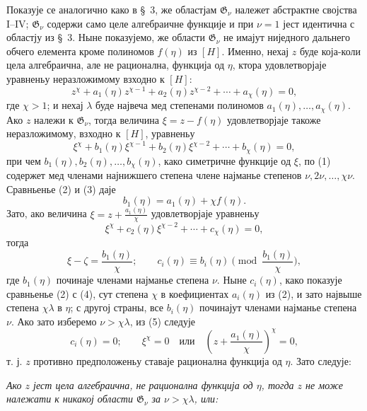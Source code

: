 ﻿\documentclass[11pt]{article}
\begin{document}
Показује се аналогично како в \S\ 3, же областјам $\mathfrak G_\nu$ належет
абстрактне својства I--IV; $\mathfrak G_\nu$ содержи само целе алгебраичне
функције и при $\nu=1$ јест идентична с областју из \S\ 3. Ныне показујемо, же
области $\mathfrak G_\nu$ не имајут ниједного дальнего обчего елемента кроме
полиномов $f(\eta)$ из $[H]$. Именно, нехај $z$ буде која-коли цела
алгебраична, але не рационална, функција од $\eta$, ктора удовлетворјаје
уравненьу неразложимому взходно к $[H]$:
\begin{equation}
z^\chi+a_1(\eta)z^{\chi-1}+a_2(\eta)z^{\chi-2}+\cdots+a_\chi(\eta)=0,
\tag{2}
\end{equation}
где $\chi>1$; и нехај $\lambda$ буде највеча мед степенами полиномов
$a_1(\eta),\ldots,a_\chi(\eta)$. Ако $z$ належи к $\mathfrak G_\nu$, тогда
величина $\xi=z-f(\eta)$ удовлетворјаје такоже неразложимому, взходно к $[H]$,
уравненьу
\begin{equation}
\xi^\chi+b_1(\eta)\xi^{\chi-1}+b_2(\eta)\xi^{\chi-2}+\cdots+b_\chi(\eta)=0,
\tag{3}
\end{equation}
при чем $b_1(\eta),b_2(\eta),\ldots,b_\chi(\eta)$, како симетричне функције од
$\xi$, по (1) содержет мед членами најнижшего степена члене најманье степенов
$\nu,2\nu,\ldots,\chi\nu$. Сравньенье (2) и (3) даје
\[
 b_1(\eta)=a_1(\eta)+\chi f(\eta).
\]
Зато, ако величина $\xi=z+\frac{a_1(\eta)}{\chi}$ удовлетворјаје уравненьу
\begin{equation}
\xi^\chi+c_2(\eta)\xi^{\chi-2}+\cdots+c_\chi(\eta)=0,
\tag{4}
\end{equation}
тогда
\begin{equation}
 \xi-\zeta=\frac{b_1(\eta)}{\chi};
 \qquad
 c_i(\eta)\equiv b_i(\eta)\pmod{\frac{b_1(\eta)}{\chi}},
\tag{5}
\end{equation}
где $b_1(\eta)$ починаје членами најманье степена $\nu$. Ныне $c_i(\eta)$,
како показује сравньенье (2) с (4), сут степена $\chi$ в коефициентах
$a_i(\eta)$ из (2), и зато највыше степена $\chi\lambda$ в $\eta$; с другој
страны, все $b_i(\eta)$ починајут членами најманье степена $\nu$. Ако зато
изберемо $\nu>\chi\lambda$, из (5) следује
\[
 c_i(\eta)=0;\qquad
 \xi^\chi=0\quad\text{или}\quad
 \left(z+\frac{a_1(\eta)}{\chi}\right)^\chi=0,
\]
т. ј. $z$ противно предположеньу ставаје рационална функција од $\eta$. Зато
следује:

{\itshape Ако $z$ јест цела алгебраична, не рационална функција од $\eta$, тогда
$z$ не може належати к никакој области $\mathfrak G_\nu$ за
$\nu>\chi\lambda$, или:}
\end{document}

